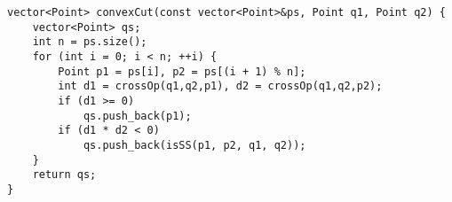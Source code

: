 \begin{lstlisting} 
vector<Point> convexCut(const vector<Point>&ps, Point q1, Point q2) {
	vector<Point> qs;
	int n = ps.size();
	for (int i = 0; i < n; ++i) {
		Point p1 = ps[i], p2 = ps[(i + 1) % n];
		int d1 = crossOp(q1,q2,p1), d2 = crossOp(q1,q2,p2);
		if (d1 >= 0)
			qs.push_back(p1);
		if (d1 * d2 < 0)
			qs.push_back(isSS(p1, p2, q1, q2));
	}
	return qs;
}
\end{lstlisting} 
